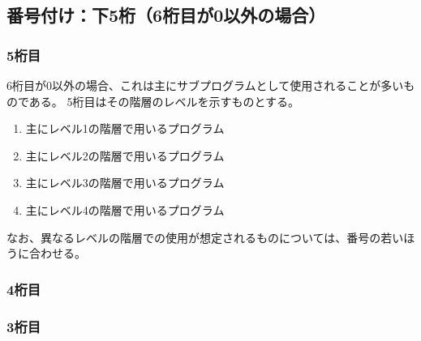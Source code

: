 \subsection{番号付け：下5桁（6桁目が0以外の場合）}



\subsubsection{5桁目}
6桁目が0以外の場合、これは主にサブプログラムとして使用されることが多いものである。
5桁目はその階層のレベルを示すものとする。
\begin{enumerate}[start=1]
\item 主にレベル1の階層で用いるプログラム
\item 主にレベル2の階層で用いるプログラム
\item 主にレベル3の階層で用いるプログラム
\item 主にレベル4の階層で用いるプログラム
\end{enumerate}
なお、異なるレベルの階層での使用が想定されるものについては、番号の若いほうに合わせる。



\subsubsection{4桁目}



\subsubsection{3桁目}



